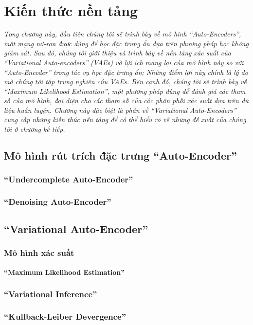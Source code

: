 \chapter{Kiến thức nền tảng}
\label{Chapter2}
\textit{Tong chương này, đầu tiên chúng tôi sẽ trình bày về mô hình 
``Auto-Encoders'', một mạng nơ-ron được dùng để học đặc trưng ẩn dựa trên
phương pháp học không giám sát.
Sau đó, chúng tôi giới thiệu và trình bày về nền tảng xác suất 
của ``Variational Auto-encoders'' (VAEs) và lợi ích mang lại của 
mô hình này so với ``Auto-Encoder'' trong tác vụ học đặc trưng ẩn; 
Những điểm lợi này chính là lý do mà chúng tôi tập trung nghiên cứu VAEs. 
Bên cạnh đó, chúng tôi sẽ trình bày về ``Maximum Likelihood Estimation'', 
một phương pháp dùng để đánh giá các tham số của mô hình, đại diện cho các tham số 
của các phân phối xác suất dựa trên dữ liệu huấn luyện. 
Chương này đặc biệt là phần về ``Variational Auto-Encoders'' 
cung cấp những kiến thức nền tảng để có thể hiểu rõ về những đề xuất 
của chúng tôi ở chương kế tiếp.}


\section{Mô hình rút trích đặc trưng ``Auto-Encoder''}
\label{chap2/sec1}
    \subsection{``Undercomplete Auto-Encoder''}
    \label{chap2/subsec11}
    \subsection{``Denoising Auto-Encoder''}
    \label{chap2/subsec12}

\section{``Variational Auto-Encoder''}
    \subsection{Mô hình xác suất}
        \subsubsection{``Maximum Likelihood Estimation''}
    \subsection{``Variational Inference''}
    \subsection{``Kullback-Leiber Devergence''}
